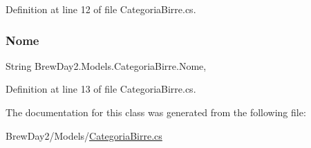 Definition at line 12 of file Categoria\+Birre.\+cs.

\mbox{\label{class_brew_day2_1_1_models_1_1_categoria_birre_a29c18046151f05ba12aee8aa0e43fec4}} 
\subsubsection{\texorpdfstring{Nome}{Nome}}
{\footnotesize\ttfamily String Brew\+Day2.\+Models.\+Categoria\+Birre.\+Nome\hspace{0.3cm}{\ttfamily [get]}, {\ttfamily [set]}}



Definition at line 13 of file Categoria\+Birre.\+cs.



The documentation for this class was generated from the following file\+:\begin{DoxyCompactItemize}
\item 
Brew\+Day2/\+Models/\mbox{\hyperlink{_categoria_birre_8cs}{Categoria\+Birre.\+cs}}\end{DoxyCompactItemize}
